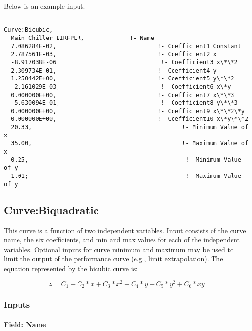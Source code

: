 Below is an example input.

\begin{lstlisting}

Curve:Bicubic,
  Main Chiller EIRFPLR,             !- Name
  7.086284E-02,                             !- Coefficient1 Constant
  2.787561E-03,                             !- Coefficient2 x
  -8.917038E-06,                             !- Coefficient3 x\*\*2
  2.309734E-01,                             !- Coefficient4 y
  1.250442E+00,                             !- Coefficient5 y\*\*2
  -2.161029E-03,                             !- Coefficient6 x\*y
  0.000000E+00,                             !- Coefficient7 x\*\*3
  -5.630094E-01,                             !- Coefficient8 y\*\*3
  0.000000E+00,                             !- Coefficient9 x\*\*2\*y
  0.000000E+00,                             !- Coefficient10 x\*y\*\*2
  20.33,                                           !- Minimum Value of x
  35.00,                                           !- Maximum Value of x
  0.25,                                             !- Minimum Value of y
  1.01;                                             !- Maximum Value of y
\end{lstlisting}

\subsection{Curve:Biquadratic}\label{curvebiquadratic}

This curve is a function of two independent variables. Input consists of the curve name, the six coefficients, and min and max values for each of the independent variables. Optional inputs for curve minimum and maximum may be used to limit the output of the performance curve (e.g., limit extrapolation). The equation represented by the bicubic curve is:

\begin{equation}
z = {C_1} + {C_2}*x + {C_3}*{x^2} + {C_4}*y + {C_5}*{y^2} + {C_6}*xy
\end{equation}

\subsubsection{Inputs}\label{inputs-7-016}

\paragraph{Field: Name}\label{field-name-7-012}

